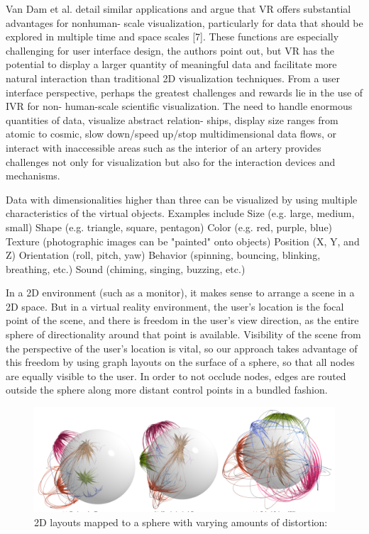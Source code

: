 Van Dam et al. detail similar applications and argue that VR offers substantial advantages for nonhuman- scale visualization, particularly for data that should be explored in multiple time and space scales [7]. These functions are especially challenging for user interface design, the authors point out, but VR has the potential to display a larger quantity of meaningful data and facilitate more natural interaction than traditional 2D visualization techniques.
\cite{Drouhard2015}
From a user interface perspective, perhaps the greatest challenges and rewards lie in the use of IVR for non- human-scale scientific visualization. The need to handle enormous quantities of data, visualize abstract relation- ships, display size ranges from atomic to cosmic, slow down/speed up/stop multidimensional data flows, or interact with inaccessible areas such as the interior of an artery provides challenges not only for visualization but also for the interaction devices and mechanisms.
\cite{VanDam2002}

Data with dimensionalities higher than three can be visualized by using multiple characteristics of the virtual objects. Examples include
Size (e.g. large, medium, small)
Shape (e.g. triangle, square, pentagon)
Color (e.g. red, purple, blue)
Texture (photographic images can be "painted" onto objects)
Position (X, Y, and Z)
Orientation (roll, pitch, yaw)
Behavior (spinning, bouncing, blinking, breathing, etc.)
Sound (chiming, singing, buzzing, etc.)
\cite{Stone1994}

In a 2D environment (such as a monitor), it makes sense to arrange a scene in a 2D space. But in a virtual reality environment, the user’s location is the focal point of the scene, and there is freedom in the user’s view direction, as the entire sphere of directionality around that point is available. Visibility of the scene from the perspective of the user’s location is vital, so our approach takes advantage of this freedom by using graph layouts on the surface of a sphere, so that all nodes are equally visible to the user. In order to not occlude nodes, edges are routed outside the sphere along more distant control points in a bundled fashion.
\cite{Kwon2015}

\begin{figure}[h]
	\begin{center}
		\includegraphics[width=14cm]{03_Figures/05_LitReview/Kwon2015_SphericalGraphLayout.png}
		\caption[2D layouts mapped to a sphere with varying amounts of distortion]{2D layouts mapped to a sphere with varying amounts of distortion:  \citep{Kwon2015}}
		\label{fig:sphericalgraph}
	\end{center}
\end{figure}


